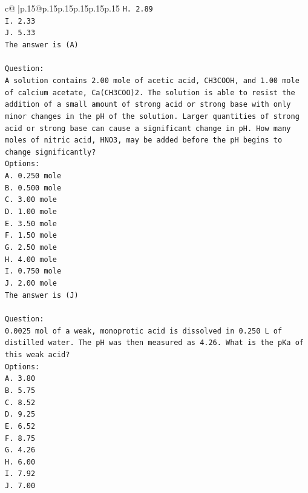 \documentclass{article}
\begin{document}
{\begin{supertabular}{c@{$\;$}|p{.15\linewidth}@{}p{.15\linewidth}p{.15\linewidth}p{.15\linewidth}p{.15\linewidth}p{.15\linewidth}}
{{{\texttt{H. 2.89} \\
\texttt{I. 2.33} \\
\texttt{J. 5.33} \\
\texttt{The answer is (A)} \\
\\ 
\texttt{Question:} \\
\texttt{A solution contains 2.00 mole of acetic acid, CH3COOH, and 1.00 mole of calcium acetate, Ca(CH3COO)2. The solution is able to resist the addition of a small amount of strong acid or strong base with only minor changes in the pH of the solution. Larger quantities of strong acid or strong base can cause a significant change in pH. How many moles of nitric acid, HNO3, may be added before the pH begins to change significantly?} \\
\texttt{Options:} \\
\texttt{A. 0.250 mole} \\
\texttt{B. 0.500 mole} \\
\texttt{C. 3.00 mole} \\
\texttt{D. 1.00 mole} \\
\texttt{E. 3.50 mole} \\
\texttt{F. 1.50 mole} \\
\texttt{G. 2.50 mole} \\
\texttt{H. 4.00 mole} \\
\texttt{I. 0.750 mole} \\
\texttt{J. 2.00 mole} \\
\texttt{The answer is (J)} \\
\\ 
\texttt{Question:} \\
\texttt{0.0025 mol of a weak, monoprotic acid is dissolved in 0.250 L of distilled water. The pH was then measured as 4.26. What is the pKa of this weak acid?} \\
\texttt{Options:} \\
\texttt{A. 3.80} \\
\texttt{B. 5.75} \\
\texttt{C. 8.52} \\
\texttt{D. 9.25} \\
\texttt{E. 6.52} \\
\texttt{F. 8.75} \\
\texttt{G. 4.26} \\
\texttt{H. 6.00} \\
\texttt{I. 7.92} \\
\texttt{J. 7.00} \\
            }
        }
    }
     \\ \\


\end{supertabular}}
\end{document}
